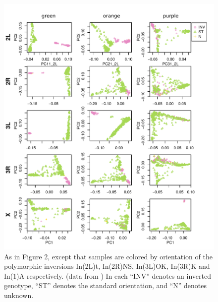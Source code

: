 \documentclass[11pt, oneside]{article}   	%
\begin{document}
\begin{figure}
    \begin{center}
       \includegraphics{Fig3_pca_plots_color_by_inv_allchr_with_ChrX_In1A}
    \end{center}
    \caption{
         As in Figure 2, except that samples are colored by orientation of the polymorphic inversions 
         In(2L)t, In(2R)NS, In(3L)OK, In(3R)K and In(1)A respectively. 
         (data from \citep{lack2015drosophila})
         In each ``INV'' denotes an inverted genotype, ``ST'' denotes the standard orientation,
         and ``N'' denotes unknown.
        \label{fig:pca_by_inversion}
    }
\end{figure}
\end{document}
